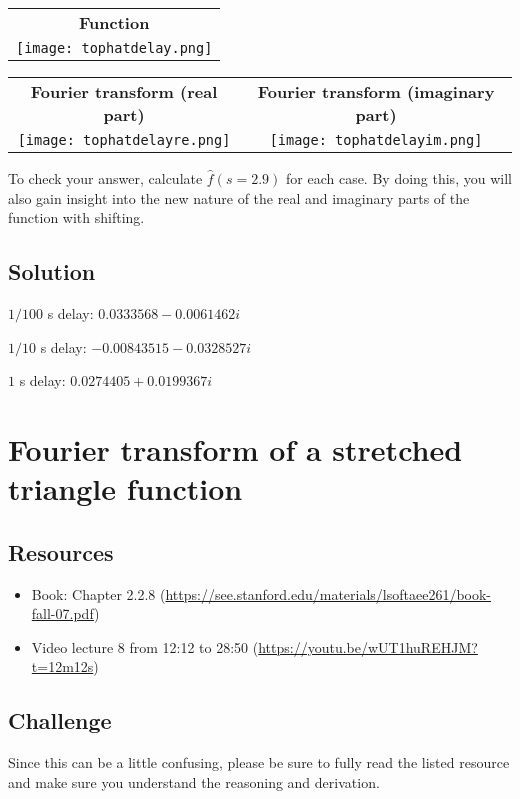 \begin{tabular}{c}
    \textbf{Function} \\
    \texttt{[image: tophatdelay.png]}
\end{tabular}

\begin{tabular}{cc}
    \textbf{Fourier transform (real part)} & \textbf{Fourier transform (imaginary part)}\\
    \texttt{[image: tophatdelayre.png]} & \texttt{[image: tophatdelayim.png]}
\end{tabular}

To check your answer, calculate $\hat{f}(s=2.9)$ for each case. By doing this, you will also gain insight into the new nature of the real and imaginary parts of the function with shifting.

\subsection*{Solution}
$1/100$ s delay: $0.0333568 - 0.0061462i$

$1/10$ s delay: $-0.00843515 - 0.0328527i$

$1$ s delay: $0.0274405 + 0.0199367i$




\newpage
\section{Fourier transform of a stretched triangle function}

\subsection*{Resources}
\begin{itemize}
    \item Book: Chapter 2.2.8 (\url{https://see.stanford.edu/materials/lsoftaee261/book-fall-07.pdf})
    \item Video lecture 8 from 12:12 to 28:50 (\url{https://youtu.be/wUT1huREHJM?t=12m12s})
\end{itemize}

\subsection*{Challenge}
Since this can be a little confusing, please be sure to fully read the listed resource and make sure you understand the reasoning and derivation.

